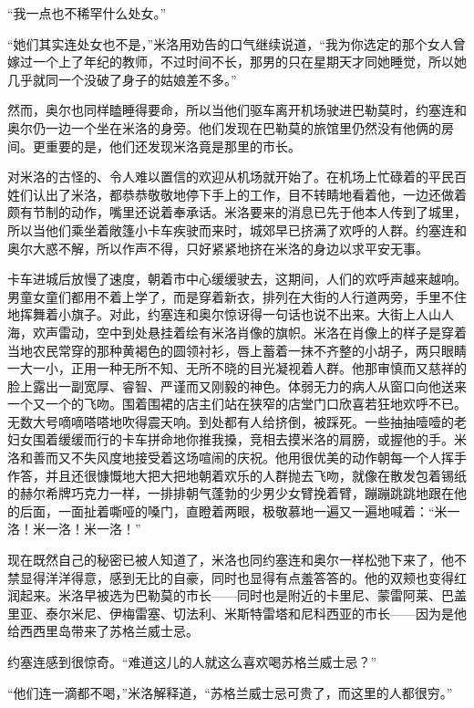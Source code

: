     “我一点也不稀罕什么处女。”

    “她们其实连处女也不是，”米洛用劝告的口气继续说道，“我为你选定的那个女人曾嫁过一个上了年纪的教师，不过时间不长，那男的只在星期天才同她睡觉，所以她几乎就同一个没破了身子的姑娘差不多。”

    然而，奥尔也同样瞌睡得要命，所以当他们驱车离开机场驶进巴勒莫时，约塞连和奥尔仍一边一个坐在米洛的身旁。他们发现在巴勒莫的旅馆里仍然没有他俩的房间。更重要的是，他们还发现米洛竟是那里的市长。

    对米洛的古怪的、令人难以置信的欢迎从机场就开始了。在机场上忙碌着的平民百姓们认出了米洛，都恭恭敬敬地停下手上的工作，目不转睛地看着他，一边还做着颇有节制的动作，嘴里还说着奉承话。米洛要来的消息已先于他本人传到了城里，所以当他们乘坐着敞篷小卡车疾驶而来时，城郊早已挤满了欢呼的人群。约塞连和奥尔大惑不解，所以作声不得，只好紧紧地挤在米洛的身边以求平安无事。

    卡车进城后放慢了速度，朝着市中心缓缓驶去，这期间，人们的欢呼声越来越响。男童女童们都用不着上学了，而是穿着新衣，排列在大街的人行道两旁，手里不住地挥舞着小旗子。对此，约塞连和奥尔惊讶得一句话也说不出来。大街上人山人海，欢声雷动，空中到处悬挂着绘有米洛肖像的旗帜。米洛在肖像上的样子是穿着当地农民常穿的那种黄褐色的圆领衬衫，唇上蓄着一抹不齐整的小胡子，两只眼睛一大一小，正用一种无所不知、无所不晓的目光凝视着人群。他那审慎而又慈祥的脸上露出一副宽厚、睿智、严谨而又刚毅的神色。体弱无力的病人从窗口向他送来一个又一个的飞吻。围着围裙的店主们站在狭窄的店堂门口欣喜若狂地欢呼不已。无数大号嘀嘀嗒嗒地吹得震天响。到处都有人给挤倒，被踩死。一些抽抽噎噎的老妇女围着缓缓而行的卡车拼命地你推我搡，竞相去摸米洛的肩膀，或握他的手。米洛和善而又不失风度地接受着这场喧闹的庆祝。他用很优美的动作朝每一个人挥手作答，并且还很慷慨地大把大把地朝着欢乐的人群抛去飞吻，就像在散发包着锡纸的赫尔希牌巧克力一样，一排排朝气蓬勃的少男少女臂挽着臂，蹦蹦跳跳地跟在他的后面，一面扯着嘶哑的嗓门，直瞪着两眼，极敬慕地一遍又一遍地喊着：“米一洛！米一洛！米一洛！”
 


    现在既然自己的秘密已被人知道了，米洛也同约塞连和奥尔一样松弛下来了，他不禁显得洋洋得意，感到无比的自豪，同时也显得有点羞答答的。他的双颊也变得红润起来。米洛早被选为巴勒莫的市长——同时也是附近的卡里尼、蒙雷阿莱、巴盖里亚、泰尔米尼、伊梅雷塞、切法利、米斯特雷塔和尼科西亚的市长——因为是他给西西里岛带来了苏格兰威士忌。

    约塞连感到很惊奇。“难道这儿的人就这么喜欢喝苏格兰威士忌？”

    “他们连一滴都不喝，”米洛解释道，“苏格兰威士忌可贵了，而这里的人都很穷。”

